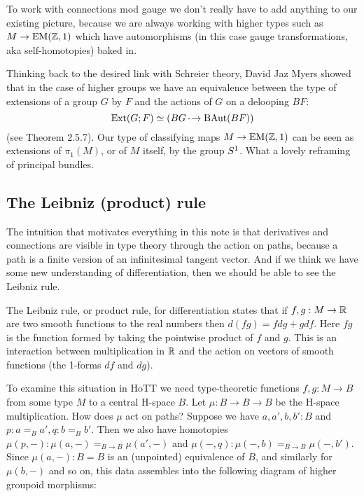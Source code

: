 To work with connections mod gauge we don't really have to add anything to our existing picture, because we are always working with higher types such as \( M\to\mathrm{EM}(\mathbb{Z},1) \) which have automorphisms (in this case gauge transformations, aka self-homotopies) baked in.

Thinking back to the desired link with Schreier theory, David Jaz Myers showed that in the case of higher groups we have an equivalence between the type of extensions of a group \( G \) by \( F \) and the actions of \( G \) on a delooping \( BF \):
\[ 
\mathrm{Ext}(G; F) \simeq (BG \,\cdot\!\to \operatorname{BAut}(BF))
\]
(see \cite{myersthesis} Theorem 2.5.7). Our type of classifying maps \( M\to\mathrm{EM}(\mathbb{Z},1) \) can be seen as extensions of \( \pi_1(M) \), or of \( M \) itself, by the group \( S^1 \). What a lovely reframing of principal bundles.

\subsection{The Leibniz (product) rule}

The intuition that motivates everything in this note is that derivatives and connections are visible in type theory through the action on paths, because a path is a finite version of an infinitesimal tangent vector. And if we think we have some new understanding of differentiation, then we should be able to see the Leibniz rule.

The Leibniz rule, or product rule, for differentiation states that if \( f, g:M\to \mathbb{R} \) are two smooth functions to the real numbers then \( d(fg) = fdg + gdf \). Here \( fg \) is the function formed by taking the pointwise product of \( f \) and \( g \). This is an interaction between multiplication in \( \mathbb{R} \) and the action on vectors of smooth functions (the 1-forms \( df \) and \( dg \)). 

To examine this situation in HoTT we need type-theoretic functions \( f, g:M\to B \) from some type \( M \) to a central H-space \( B \). Let \( \mu:B\to B\to B \) be the H-space multiplication. How does \( \mu \) act on paths? Suppose we have \( a, a', b, b':B \) and \( p:a=_B a', q:b=_B b' \). Then we also have homotopies \( \mu(p, -):\mu(a, -)=_{B\to B}\mu(a', -) \) and \( \mu(-,q):\mu(-,b)=_{B\to B}\mu(-,b'). \) Since \( \mu(a, -):B=B \) is an (unpointed) equivalence of \( B \), and similarly for \( \mu(b, -) \) and so on, this data assembles into the following diagram of higher groupoid morphisms:


